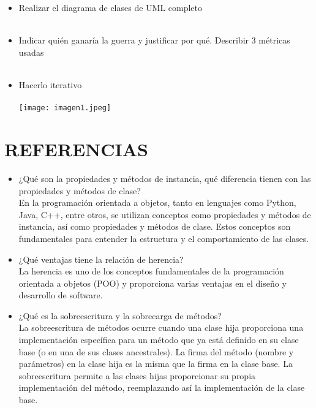 \documentclass{article}
\begin{document}
\begin{itemize}
\begin{itemize}
        \\
        \\
        \item Realizar el diagrama de clases de UML completo
        \\
        \\
        \item Indicar quién ganaría la guerra y justificar por qué. Describir 3 métricas usadas
        \\
        \\
        \item Hacerlo iterativo
        \\
        \\
        \texttt{[image: imagen1.jpeg]}

	\end{itemize}

    \section{REFERENCIAS}
	\begin{itemize}
		\item ¿Qué son la propiedades y métodos de instancia, qué diferencia tienen con las propiedades y métodos de clase?
        \\
        \text En la programación orientada a objetos, tanto en lenguajes como Python, Java, C++, entre otros, se utilizan conceptos como propiedades y métodos de instancia, así como propiedades y métodos de clase. Estos conceptos son fundamentales para entender la estructura y el comportamiento de las clases.
		\item ¿Qué ventajas tiene la relación de herencia?
        \\
        \text La herencia es uno de los conceptos fundamentales de la programación orientada a objetos (POO) y proporciona varias ventajas en el diseño y desarrollo de software. 
		\item ¿Qué es la sobreescritura y la sobrecarga de métodos?
        \\
        \text La sobreescritura de métodos ocurre cuando una clase hija proporciona una implementación específica para un método que ya está definido en su clase base (o en una de sus clases ancestrales). La firma del método (nombre y parámetros) en la clase hija es la misma que la firma en la clase base. La sobreescritura permite a las clases hijas proporcionar su propia implementación del método, reemplazando así la implementación de la clase base.
	\end{itemize}

\end{itemize}
\end{document}
